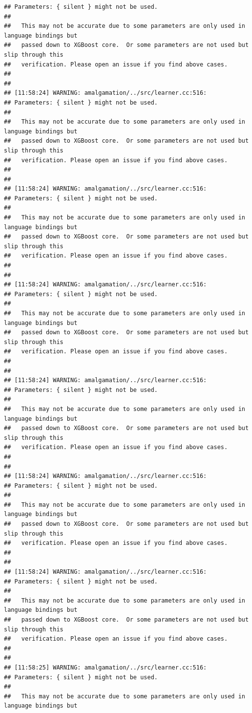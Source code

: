 \documentclass[AMS,STIX2COL]{WileyNJD-v2}\usepackage[]{graphicx}\usepackage[]{color}
\makeatletter
\newenvironment{kframe}{%
 \def\at@end@of@kframe{}%
 \ifinner\ifhmode%
  \def\at@end@of@kframe{\end{minipage}}%
  \begin{minipage}{\columnwidth}%
 \fi\fi%
 \def\FrameCommand##1{\hskip\@totalleftmargin \hskip-\fboxsep
 \colorbox{shadecolor}{##1}\hskip-\fboxsep
     \hskip-\linewidth \hskip-\@totalleftmargin \hskip\columnwidth}%
 \MakeFramed {\advance\hsize-\width
   \@totalleftmargin\z@ \linewidth\hsize
   \@setminipage}}%
 {\par\unskip\endMakeFramed%
 \at@end@of@kframe}
\newenvironment{knitrout}{}{} %
\makeatother
\begin{document}
\begin{knitrout}
\begin{kframe}
\begin{verbatim}
## Parameters: { silent } might not be used.
## 
##   This may not be accurate due to some parameters are only used in language bindings but
##   passed down to XGBoost core.  Or some parameters are not used but slip through this
##   verification. Please open an issue if you find above cases.
## 
## 
## [11:58:24] WARNING: amalgamation/../src/learner.cc:516: 
## Parameters: { silent } might not be used.
## 
##   This may not be accurate due to some parameters are only used in language bindings but
##   passed down to XGBoost core.  Or some parameters are not used but slip through this
##   verification. Please open an issue if you find above cases.
## 
## 
## [11:58:24] WARNING: amalgamation/../src/learner.cc:516: 
## Parameters: { silent } might not be used.
## 
##   This may not be accurate due to some parameters are only used in language bindings but
##   passed down to XGBoost core.  Or some parameters are not used but slip through this
##   verification. Please open an issue if you find above cases.
## 
## 
## [11:58:24] WARNING: amalgamation/../src/learner.cc:516: 
## Parameters: { silent } might not be used.
## 
##   This may not be accurate due to some parameters are only used in language bindings but
##   passed down to XGBoost core.  Or some parameters are not used but slip through this
##   verification. Please open an issue if you find above cases.
## 
## 
## [11:58:24] WARNING: amalgamation/../src/learner.cc:516: 
## Parameters: { silent } might not be used.
## 
##   This may not be accurate due to some parameters are only used in language bindings but
##   passed down to XGBoost core.  Or some parameters are not used but slip through this
##   verification. Please open an issue if you find above cases.
## 
## 
## [11:58:24] WARNING: amalgamation/../src/learner.cc:516: 
## Parameters: { silent } might not be used.
## 
##   This may not be accurate due to some parameters are only used in language bindings but
##   passed down to XGBoost core.  Or some parameters are not used but slip through this
##   verification. Please open an issue if you find above cases.
## 
## 
## [11:58:24] WARNING: amalgamation/../src/learner.cc:516: 
## Parameters: { silent } might not be used.
## 
##   This may not be accurate due to some parameters are only used in language bindings but
##   passed down to XGBoost core.  Or some parameters are not used but slip through this
##   verification. Please open an issue if you find above cases.
## 
## 
## [11:58:25] WARNING: amalgamation/../src/learner.cc:516: 
## Parameters: { silent } might not be used.
## 
##   This may not be accurate due to some parameters are only used in language bindings but

\end{verbatim}
\end{kframe}
\end{knitrout}
\end{document}
